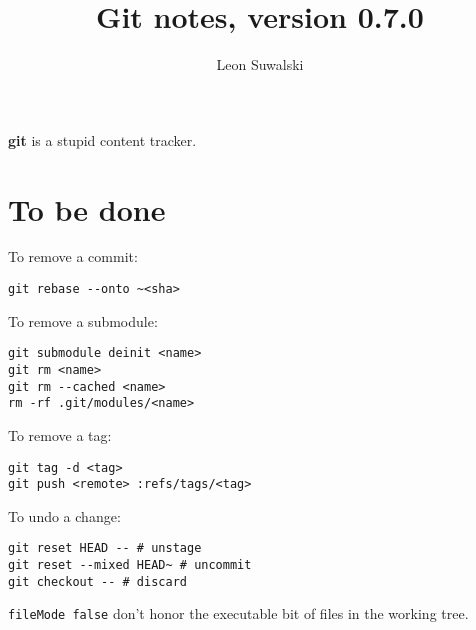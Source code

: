 \documentclass{charun}
\title{Git notes, version 0.7.0}
\author{Leon Suwalski}
\begin{document}
\begin{multicols*}{2}
\maketitle
\raggedright

\textbf{git} is a stupid content tracker.





























\section{To be done}
To remove a commit:
\begin{verbatim}
git rebase --onto ~<sha>
\end{verbatim}

To remove a submodule:
\begin{verbatim}
git submodule deinit <name>
git rm <name>
git rm --cached <name>
rm -rf .git/modules/<name>
\end{verbatim}

To remove a tag:
\begin{verbatim}
git tag -d <tag>
git push <remote> :refs/tags/<tag>
\end{verbatim}

To undo a change:
\begin{verbatim}
git reset HEAD -- # unstage
git reset --mixed HEAD~ # uncommit
git checkout -- # discard
\end{verbatim}

\texttt{fileMode false} don't honor the executable bit of files in the working tree.


\end{multicols*}
\end{document}
